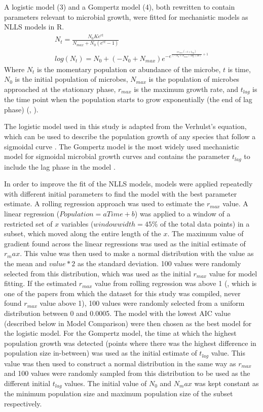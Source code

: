 \documentclass[11pt, a4paper]{article}
\begin{document}
A logistic model (3) and a Gompertz model (4), both rewritten to contain parameters relevant to microbial growth, were fitted for mechanistic models as NLLS models in R. 
\begin{align}
N_t= \frac{N_0 Ke^{rt}}{N_{max} + N_0 \left(e^{rt} - 1\right)} \\
log(N_t) = N_{0} + \left(- N_{0} + N_{max}\right) e^{- e^{\frac{e r_{max} \left(- t + t_{lag}\right)}{\left(- N_{0} + N_{max}\right) \log{\left(10 \right)}} + 1}}
\end{align}
Where $N_t$ is the momentary population or abundance of the microbe, $t$ is time, $N_0$ is the initial population of microbes, $N_{max}$ is the population of microbes approached at the stationary phase, $r_{max}$ is the maximum growth rate, and $t_{lag}$ is the time point when the population starts to grow exponentially (the end of lag phase) (\cite{Zwietering1990}, \citep{Micha2011}).\par

The logistic model used in this study is adapted from the Verhulst’s equation, which can be used to describe the population growth of any species that follow a sigmoidal curve \cite{Micha2011}. The Gompertz model is the most widely used mechanistic model for sigmoidal microbial growth curves and contains the parameter $t_{lag}$ to include the lag phase in the model \cite{Micha2011}.\par

In order to improve the fit of the NLLS models, models were applied repeatedly with different initial parameters to find the model with the best parameter estimate. A rolling regression approach was used to estimate the $r_{max}$ value. A linear regression ($Population = a Time + b$) was applied to a window of a restricted set of $x$ variables ($window width = 45\%$ of the total data points) in a subset, which moved along the entire length of the $x$. The maximum value of gradient found across the linear regressions was used as the initial estimate of $r_max$. This value was then used to make a normal distribution with the value as the mean and $value*2$ as the standard deviation. 100 values were randomly selected from this distribution, which was used as the initial $r_{max}$ value for model fitting. If the estimated $r_{max}$ value from rolling regression was above 1 (\cite{Bae2014}, which is one of the papers from which the dataset for this study was compiled, never found $r_{max}$ value above 1), 100 values were randomly selected from a uniform distribution between 0 and 0.0005. The model with the lowest AIC value (described below in Model Comparison) were then chosen as the best model for the logistic model. For the Gompertz model, the time at which the highest population growth was detected (points where there was the highest difference in population size in-between) was used as the initial estimate of $t_{lag}$ value. This value was then used to construct a normal distribution in the same way as $r_{max}$ and 100 values were randomly sampled from this distribution to be used as the different initial $t_{lag}$ values. The initial value of $N_0$ and $N_max$ was kept constant as the minimum population size and maximum population size of the subset respectively. \par
\end{document}
